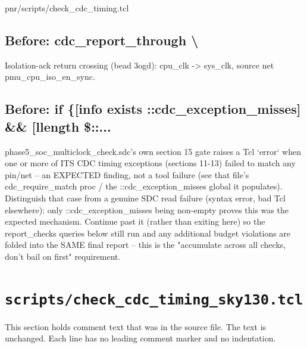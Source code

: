 \begin{relocated}{pnr/scripts/check_cdc_timing.tcl}
\subsection*{Before: cdc\_report\_through \textbackslash{}}

\begin{textblock}
Isolation-ack return crossing (bead 3ogd): cpu_clk -> sys_clk, source net pmu_cpu_iso_en_sync.
\end{textblock}

\subsection*{Before: if \{[info exists ::cdc\_exception\_misses] \&\& [llength \$::...}

\begin{textblock}
phase5_soc_multiclock_check.sdc's own section 15 gate raises a Tcl
`error` when one or more of ITS CDC timing exceptions (sections
11-13) failed to match any pin/net -- an EXPECTED finding, not a
tool failure (see that file's cdc_require_match proc / the
::cdc_exception_misses global it populates). Distinguish that case
from a genuine SDC read failure (syntax error, bad Tcl elsewhere):
only ::cdc_exception_misses being non-empty proves this was the
expected mechanism. Continue past it (rather than exiting here) so
the report_checks queries below still run and any additional budget
violations are folded into the SAME final report -- this is the
"accumulate across all checks, don't bail on first" requirement.
\end{textblock}

\end{relocated}

\section{\texttt{scripts/check\_cdc\_timing\_sky130.tcl}}\label{tm:pd:scripts-check-cdc-timing-sky130-tcl}

This section holds comment text that was in the source file. The text is unchanged. Each line has no leading comment marker and no indentation.

